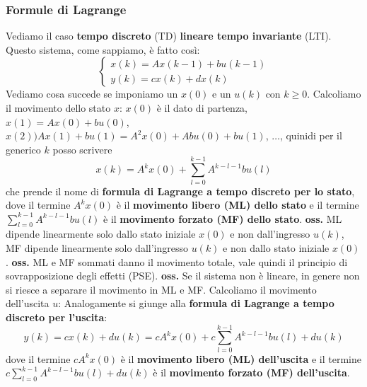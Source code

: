 \subsubsection{Formule di Lagrange}
Vediamo il caso \textbf{tempo discreto} (TD) \textbf{lineare tempo invariante} (LTI). Questo sistema, come sappiamo, è fatto così:
\[
    \begin{cases}
        x(k) = A x(k-1) + b u(k-1)\\
        y(k) = cx(k) + dx(k)
    \end{cases}
\]
Vediamo cosa succede se imponiamo un $x(0)$ e un $u(k)$ con $k\geq 0$.\newline
\newline
Calcoliamo il movimento dello stato $x$:\newline
$x(0)$ è il dato di partenza, \newline
$x(1) = Ax(0) + bu(0)$, \newline
$x(2) ) A x(1) + bu(1) = A^2 x(0) + Abu(0) + bu(1)$,\newline
$\dots$,\newline
quinidi per il generico $k$ posso scrivere
\[
    x(k) = A^kx(0) + \sum_{l=0}^{k-1}A^{k-l-1}bu(l)
\]
che prende il nome di \textbf{formula di Lagrange a tempo discreto per lo stato}, dove il termine $A^k x(0)$ è il \textbf{movimento libero (ML) dello stato} e il termine $\sum_{l=0}^{k-1}A^{k-l-1}bu(l)$ è il \textbf{movimento forzato (MF) dello stato}.\newline
\textbf{oss.}  ML dipende linearmente solo dallo stato iniziale $x(0)$ e non dall'ingresso $u(k)$, MF dipende linearmente solo dall'ingresso $u(k)$ e non dallo stato iniziale $x(0)$.\newline
\textbf{oss.}  ML e MF sommati danno il movimento totale, vale quindi il principio di sovrapposizione degli effetti (PSE).\newline
\textbf{oss.} Se il sistema non è lineare, in genere non si riesce a separare il movimento in ML e MF. \newline
\newline
Calcoliamo il movimento dell'uscita $u$:\newline
Analogamente si giunge alla \textbf{formula di Lagrange a tempo discreto per l'uscita}:
\[
    y(k) = cx(k) + du(k) = c A^k x(0) + c \sum_{l=0}^{k-1}A^{k-l-1}bu(l) + du(k)
\]
dove il termine $c A^k x(0)$ è il \textbf{movimento libero (ML) dell'uscita} e il termine $c \sum_{l=0}^{k-1}A^{k-l-1}bu(l) + du(k)$ è il \textbf{movimento forzato (MF) dell'uscita}.\newline
